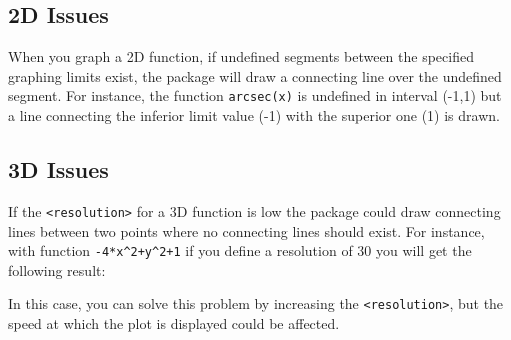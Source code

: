 \documentclass[a4paper,12pt]{article}
\begin{document}
	
	\subsection{2D Issues }
	
	When you graph a 2D function, if undefined segments between the specified graphing limits exist, the package will draw a connecting line over the undefined segment. For instance, the function \verb-arcsec(x)- is undefined in interval (-1,1) but a line connecting the inferior limit value (-1) with the superior one (1) is drawn.

\begin{iplotdd}[width=200,height=200]
\end{iplotdd}
\clearpage
\subsection{3D Issues}
	If the \verb+<resolution>+ for a 3D function is low the package could draw connecting lines between two points where no connecting lines should exist. For instance, with function \verb=-4*x^2+y^2+1= if you define a resolution of 30 you will get the following result:

\begin{iplotddd}[width=200,height=200]
\end{iplotddd}

In this case, you can solve this problem by increasing the \verb+<resolution>+, but the speed at which the plot is displayed could be affected.
\end{document}
